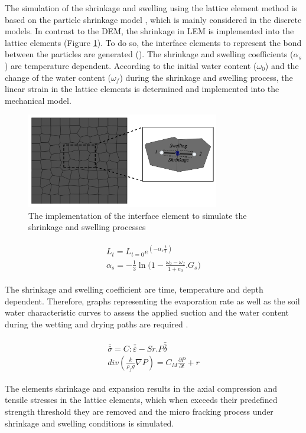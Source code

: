The simulation of the shrinkage and swelling using the lattice element method is based on the particle shrinkage model \cite{Simaetal2013}, which is mainly considered in the discrete models. In contrast to the DEM, the shrinkage in LEM is implemented into the lattice elements (Figure \ref{fig:Amir_LEM_Shrinkage}). To do so, the interface elements to represent the bond between the particles are generated (\cite{Sattarietal2019b}). The shrinkage and swelling coefficients ($\alpha_s$) are temperature dependent. According to the initial water content ($\omega_0$) and the change of the water content ($\omega_f $) during the shrinkage and swelling process, the linear strain in the lattice elements is determined and implemented into the mechanical model. 

\begin{figure}[!ht]
\centering
\includegraphics[width=0.75\textwidth]{figures/Amir_LEM_Shrinkage.png}
\caption{The implementation of the interface element to simulate the shrinkage and swelling processes}
\label{fig:Amir_LEM_Shrinkage}
\end{figure}

\begin{align}
\label{eq:LEM_Shrinkage_1}
\begin{split}
L_t=L_{t=0}e^{(-\alpha_s\frac{t}{T})}\\
\alpha_s=-\frac{1}{3}\ln{(1-\frac{\omega_0-\omega_f}{1+e_0}}.G_s)
\end{split}
\end{align} 

The shrinkage and swelling coefficient are time, temperature and depth dependent. Therefore, graphs representing the evaporation rate as well as the soil water characteristic curves to assess the applied suction and the water content during the wetting and drying paths are required \cite{Voetal2017}. 

\begin{align}
\label{eq:LEM_Shrinkage_2}
\begin{split}
\bar{\bar{\sigma}}=C:\bar{\bar{\varepsilon}}-Sr.P\bar{\bar{\delta}}\\
div\left(\frac{k}{\rho_fg}\nabla P\right)=C_M\frac{\partial P}{\partial t}+r
\end{split}
\end{align} 

The elements shrinkage and expansion results in the axial compression and tensile stresses in the lattice elements, which when exceeds their predefined strength threshold they are removed and the micro fracking process under shrinkage and swelling conditions is simulated.
